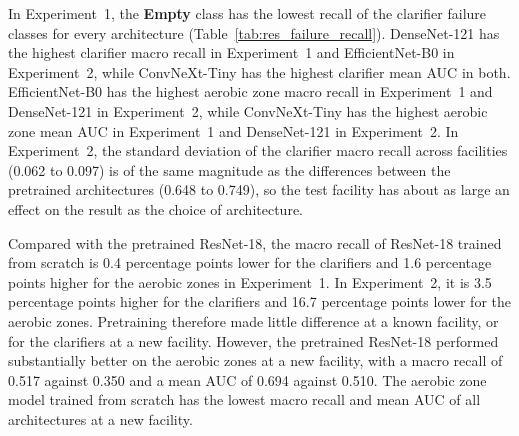 In Experiment~1, the \textbf{Empty} class has the lowest recall of the clarifier failure classes for every architecture (Table~\ref{tab:res_failure_recall}). DenseNet-121 has the highest clarifier macro recall in Experiment~1 and EfficientNet-B0 in Experiment~2, while ConvNeXt-Tiny has the highest clarifier mean AUC in both. EfficientNet-B0 has the highest aerobic zone macro recall in Experiment~1 and DenseNet-121 in Experiment~2, while ConvNeXt-Tiny has the highest aerobic zone mean AUC in Experiment~1 and DenseNet-121 in Experiment~2. In Experiment~2, the standard deviation of the clarifier macro recall across facilities (0.062 to 0.097) is of the same magnitude as the differences between the pretrained architectures (0.648 to 0.749), so the test facility has about as large an effect on the result as the choice of architecture. 

Compared with the pretrained ResNet-18, the macro recall of ResNet-18 trained from scratch is 0.4 percentage points lower for the clarifiers and 1.6 percentage points higher for the aerobic zones in Experiment~1. In Experiment~2, it is 3.5 percentage points higher for the clarifiers and 16.7 percentage points lower for the aerobic zones. Pretraining therefore made little difference at a known facility, or for the clarifiers at a new facility. However, the pretrained ResNet-18 performed substantially better on the aerobic zones at a new facility, with a macro recall of 0.517 against 0.350 and a mean AUC of 0.694 against 0.510. The aerobic zone model trained from scratch has the lowest macro recall and mean AUC of all architectures at a new facility.


